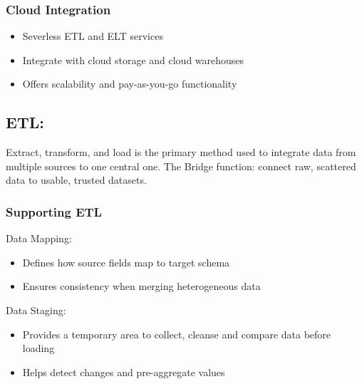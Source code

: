 \documentclass[a5paper]{article}
\begin{document}
	\subsubsection{Cloud Integration}
	\begin{itemize}
		\item Severless ETL and ELT services
		\item Integrate with cloud storage and cloud warehouses
		\item Offers scalability and pay-as-you-go functionality
	\end{itemize}
	\subsection{ETL:}
	Extract, transform, and load is the primary method used to integrate data from multiple sources to one central one. The Bridge function: connect raw, scattered data to usable, trusted datasets.
	\subsubsection{Supporting ETL}
	Data Mapping:
	\begin{itemize}
		\item Defines how source fields map to target schema
		\item Ensures consistency when merging heterogeneous data
	\end{itemize}
	Data Staging:
	\begin{itemize}
		\item Provides a temporary area to collect, cleanse and compare data before loading
		\item Helps detect changes and pre-aggregate values
	\end{itemize}
\end{document}
